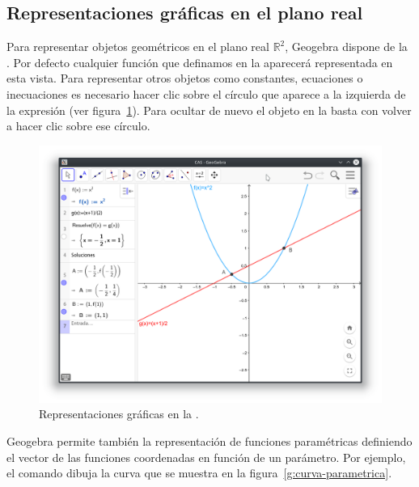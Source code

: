 \subsection*{Representaciones gráficas en el plano real}
Para representar objetos geométricos en el plano real $\mathbb{R}^2$, Geogebra dispone de la .
Por defecto cualquier función que definamos en la  aparecerá representada en esta vista.
Para representar otros objetos como constantes, ecuaciones o inecuaciones es necesario hacer clic sobre el círculo que aparece a la izquierda de la expresión (ver figura~\ref{g:vista-grafica}).
Para ocultar de nuevo el objeto en la  basta con volver a hacer clic sobre ese círculo.

\begin{figure}[h!]
\begin{center}
\includegraphics[width=\textwidth]{img/introduccion/graphic-view}
\caption{Representaciones gráficas en la .} \label{g:vista-grafica}
\end{center}
\end{figure}

Geogebra permite también la representación de funciones paramétricas definiendo el vector de las funciones coordenadas en función de un parámetro.
Por ejemplo, el comando  dibuja la curva que se muestra en la figura~\ref{g:curva-parametrica}.

